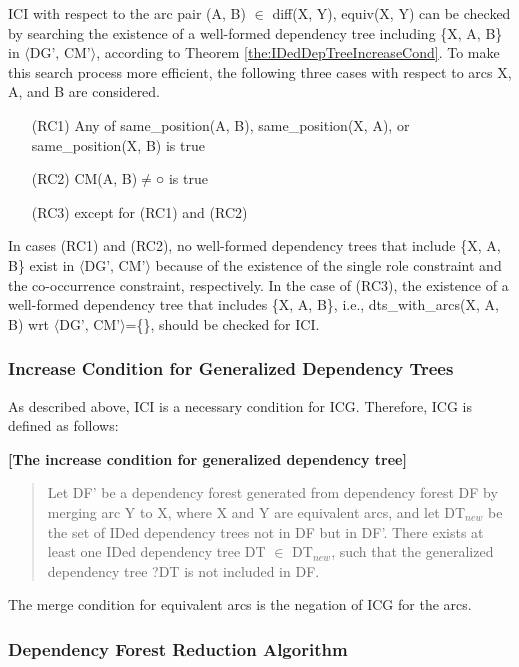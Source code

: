 \documentclass[english]{jnlp_1.4_rep}
\theoremstyle{break}
\theoremstyle{plain}
\theoremstyle{plain}
\begin{document}
\noindent
ICI with respect to the arc pair (A, B) ${\in}$ diff(X, Y),
equiv(X, Y) can be checked by searching the existence of a well-formed
dependency tree including \{X, A, B\} in $\langle\text{DG', CM'}\rangle$, according to
Theorem \ref{the:IDedDepTreeIncreaseCond}. To make this search process
more efficient, the following three cases with respect to arcs X, A, and
B are considered.

\begin{itemize}
\item[(RC1)] Any of same\_position(A, B), same\_position(X, A), or same\_position(X, B) is true
\item[(RC2)] CM(A, B)${\neq}$○ is true
\item[(RC3)] except for (RC1) and (RC2)
\end{itemize}

\noindent
In cases (RC1) and (RC2), no well-formed dependency trees that
include \{X, A, B\} exist in $\langle\text{DG', CM'}\rangle$ because of the existence of
the single role constraint and the co-occurrence constraint,
respectively. In the case of (RC3), the existence of a well-formed
dependency tree that includes \{X, A, B\}, i.e., dts\_with\_arcs(X, A, B)
wrt $\langle\text{DG', CM'}\rangle$=\{\}, should be checked for ICI.


\subsubsection{Increase Condition for Generalized Dependency Trees}

As described above, ICI is a necessary condition for ICG. Therefore, ICG is defined as follows:

\noindent
\textbf{[The increase condition for generalized dependency tree]}

\begin{quote}
Let DF' be a dependency forest generated from dependency forest DF by
merging arc Y to X, where X and Y are equivalent arcs, and let
DT$_{new}$ be the set of IDed dependency trees not in DF but in
DF'. There exists at least one IDed dependency tree DT 
${\in}$
DT$_{new}$, such that the generalized dependency tree ?DT is not
included in DF.
\end{quote}

\noindent
The merge condition for equivalent arcs is the negation of ICG for the arcs.


\subsubsection{Dependency Forest Reduction Algorithm}
\end{document}
